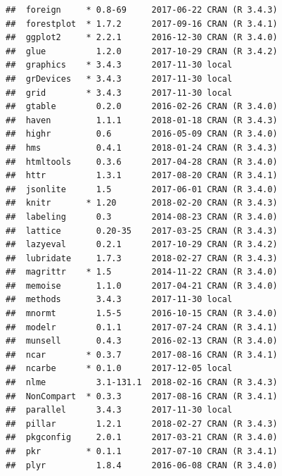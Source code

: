\documentclass[12pt,]{krantz}
\theoremstyle{definition}
\theoremstyle{definition}
\theoremstyle{definition}
\theoremstyle{remark}
\begin{document}
\begin{verbatim}
##  foreign     * 0.8-69     2017-06-22 CRAN (R 3.4.3)                      
##  forestplot  * 1.7.2      2017-09-16 CRAN (R 3.4.1)                      
##  ggplot2     * 2.2.1      2016-12-30 CRAN (R 3.4.0)                      
##  glue          1.2.0      2017-10-29 CRAN (R 3.4.2)                      
##  graphics    * 3.4.3      2017-11-30 local                               
##  grDevices   * 3.4.3      2017-11-30 local                               
##  grid        * 3.4.3      2017-11-30 local                               
##  gtable        0.2.0      2016-02-26 CRAN (R 3.4.0)                      
##  haven         1.1.1      2018-01-18 CRAN (R 3.4.3)                      
##  highr         0.6        2016-05-09 CRAN (R 3.4.0)                      
##  hms           0.4.1      2018-01-24 CRAN (R 3.4.3)                      
##  htmltools     0.3.6      2017-04-28 CRAN (R 3.4.0)                      
##  httr          1.3.1      2017-08-20 CRAN (R 3.4.1)                      
##  jsonlite      1.5        2017-06-01 CRAN (R 3.4.0)                      
##  knitr       * 1.20       2018-02-20 CRAN (R 3.4.3)                      
##  labeling      0.3        2014-08-23 CRAN (R 3.4.0)                      
##  lattice       0.20-35    2017-03-25 CRAN (R 3.4.3)                      
##  lazyeval      0.2.1      2017-10-29 CRAN (R 3.4.2)                      
##  lubridate     1.7.3      2018-02-27 CRAN (R 3.4.3)                      
##  magrittr    * 1.5        2014-11-22 CRAN (R 3.4.0)                      
##  memoise       1.1.0      2017-04-21 CRAN (R 3.4.0)                      
##  methods       3.4.3      2017-11-30 local                               
##  mnormt        1.5-5      2016-10-15 CRAN (R 3.4.0)                      
##  modelr        0.1.1      2017-07-24 CRAN (R 3.4.1)                      
##  munsell       0.4.3      2016-02-13 CRAN (R 3.4.0)                      
##  ncar        * 0.3.7      2017-08-16 CRAN (R 3.4.1)                      
##  ncarbe      * 0.1.0      2017-12-05 local                               
##  nlme          3.1-131.1  2018-02-16 CRAN (R 3.4.3)                      
##  NonCompart  * 0.3.3      2017-08-16 CRAN (R 3.4.1)                      
##  parallel      3.4.3      2017-11-30 local                               
##  pillar        1.2.1      2018-02-27 CRAN (R 3.4.3)                      
##  pkgconfig     2.0.1      2017-03-21 CRAN (R 3.4.0)                      
##  pkr         * 0.1.1      2017-07-10 CRAN (R 3.4.1)                      
##  plyr          1.8.4      2016-06-08 CRAN (R 3.4.0)                      

\end{verbatim}
\end{document}
